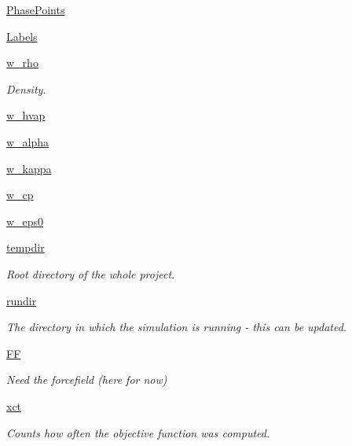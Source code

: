 \begin{DoxyCompactItemize}
\item 
\hyperlink{classforcebalance_1_1liquid_1_1Liquid_a2333919b4fc49482ed23b5e66eaa0ea8}{\-Phase\-Points}
\item 
\hyperlink{classforcebalance_1_1liquid_1_1Liquid_a16afa7eeca3234f74f60ac085dd8eb5b}{\-Labels}
\item 
\hyperlink{classforcebalance_1_1liquid_1_1Liquid_a677f8c01349a91716e10353633a4c5c1}{w\-\_\-rho}
\begin{DoxyCompactList}\small\item\em \-Density. \end{DoxyCompactList}\item 
\hyperlink{classforcebalance_1_1liquid_1_1Liquid_a7f43411fa6a9c39b63f1e82fe78ea597}{w\-\_\-hvap}
\item 
\hyperlink{classforcebalance_1_1liquid_1_1Liquid_a6ada133a0ceeb17e032f1337242afcf0}{w\-\_\-alpha}
\item 
\hyperlink{classforcebalance_1_1liquid_1_1Liquid_a19f8897aad045e3bf51eedba4606ac87}{w\-\_\-kappa}
\item 
\hyperlink{classforcebalance_1_1liquid_1_1Liquid_a614365b5ac24f312c564e4f8d2b7b4cf}{w\-\_\-cp}
\item 
\hyperlink{classforcebalance_1_1liquid_1_1Liquid_af99c11c0ba5bbfcbc53bc8d7d6125465}{w\-\_\-eps0}
\item 
\hyperlink{classforcebalance_1_1target_1_1Target_aede2856573b890cd47054ad36937d6f6}{tempdir}
\begin{DoxyCompactList}\small\item\em \-Root directory of the whole project. \end{DoxyCompactList}\item 
\hyperlink{classforcebalance_1_1target_1_1Target_a1da470037ef61c22dc44beb85cfa01a9}{rundir}
\begin{DoxyCompactList}\small\item\em \-The directory in which the simulation is running -\/ this can be updated. \end{DoxyCompactList}\item 
\hyperlink{classforcebalance_1_1target_1_1Target_a796dc30a19a60c63fb43b088d40a963f}{\-F\-F}
\begin{DoxyCompactList}\small\item\em \-Need the forcefield (here for now) \end{DoxyCompactList}\item 
\hyperlink{classforcebalance_1_1target_1_1Target_ad4cd0ab38d8fc97d3e7a6e22ce130a16}{xct}
\begin{DoxyCompactList}\small\item\em \-Counts how often the objective function was computed. \end{DoxyCompactList}\item 

\end{DoxyCompactItemize}
